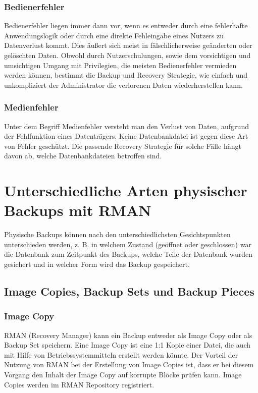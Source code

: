         \subsubsection{Bedienerfehler}
          Bedienerfehler liegen immer dann vor, wenn es entweder durch eine fehlerhafte Anwendungslogik oder durch eine direkte Fehleingabe eines Nutzers zu Datenverlust kommt. Dies \"au\ss{}ert sich meist in f\"alschlicherweise ge\"anderten oder gel\"oschten Daten. Obwohl durch Nutzerschulungen, sowie dem vorsichtigen und umsichtigen Umgang mit Privilegien, die meisten Bedienerfehler vermieden werden k\"onnen, bestimmt die Backup und Recovery Strategie, wie einfach und unkompliziert der Administrator die verlorenen Daten wiederherstellen kann.
        \subsubsection{Medienfehler}
          Unter dem Begriff Medienfehler versteht man den Verlust von Daten, aufgrund der Fehlfunktion eines Datentr\"agers. Keine Datenbankdatei ist gegen diese Art von Fehler gesch\"utzt. Die passende Recovery Strategie f\"ur solche F\"alle h\"angt davon ab, welche Datenbankdateien betroffen sind.
    \section{Unterschiedliche Arten physischer Backups mit RMAN}
      Physische Backups k\"onnen nach den unterschiedlichsten Gesichtspunkten unterschieden werden, z. B. in welchem Zustand (ge\"offnet oder geschlossen) war die Datenbank zum Zeitpunkt des Backups, welche Teile der Datenbank wurden gesichert und in welcher Form wird das Backup gespeichert.

      \subsection{Image Copies, Backup Sets und Backup Pieces}
        \subsubsection{Image Copy}
          RMAN (Recovery Manager) kann ein Backup entweder als Image Copy oder als Backup Set speichern. Eine Image Copy ist eine 1:1 Kopie einer Datei, die auch mit Hilfe von Betriebssystemmitteln erstellt werden k\"onnte. Der Vorteil der Nutzung von RMAN bei der Erstellung von Image Copies ist, dass er bei diesem Vorgang den Inhalt der Image Copy auf korrupte Bl\"ocke pr\"ufen kann. Image Copies werden im RMAN Repository registriert.

